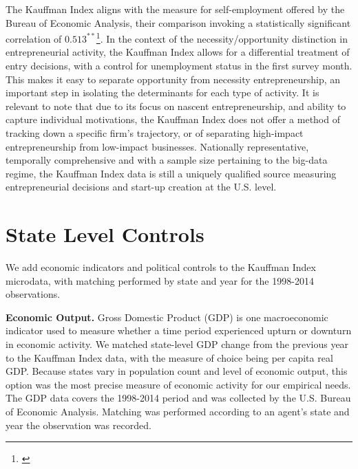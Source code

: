 The Kauffman Index aligns with the measure for self-employment offered by the Bureau of Economic Analysis, their comparison invoking a statistically significant correlation of $0.513^{**}$\footnote{\cite{Goetz2008}}. In the context of the necessity/opportunity distinction in entrepreneurial activity, the Kauffman Index allows for a differential treatment of entry decisions, with a control for unemployment status in the first survey month. This makes it easy to separate opportunity from necessity entrepreneurship, an important step in isolating the determinants for each type of activity. It is relevant to note that due to its focus on nascent entrepreneurship, and ability to capture individual motivations, the Kauffman Index does not offer a method of tracking down a specific firm’s trajectory, or of separating high-impact entrepreneurship from low-impact businesses. Nationally representative, temporally comprehensive and with a sample size pertaining to the big-data regime, the Kauffman Index data is still a uniquely qualified source measuring entrepreneurial decisions and start-up creation at the U.S. level. 

\section{State Level Controls}
We add economic indicators and political controls to the Kauffman Index microdata, with matching performed by state and year for the 1998-2014 observations. 

\textbf{Economic Output.} Gross Domestic Product (GDP) is one macroeconomic indicator used to measure whether a time period experienced upturn or downturn in economic activity. We matched state-level GDP change from the previous year to the Kauffman Index data, with the measure of choice being per capita real GDP. Because states vary in population count and level of economic output, this option was the most precise measure of economic activity for our empirical needs. The GDP data covers the 1998-2014 period and was collected by the U.S. Bureau of Economic Analysis. Matching was performed according to an agent’s state and year the observation was recorded.  

